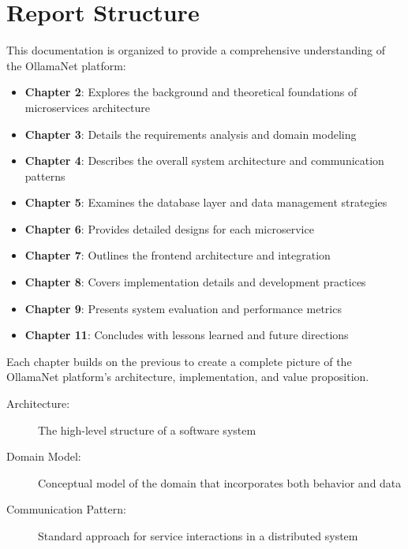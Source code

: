 \section{Report Structure}

This documentation is organized to provide a comprehensive understanding of the OllamaNet platform:

\begin{itemize}
    \item \textbf{Chapter 2}: Explores the background and theoretical foundations of microservices architecture
    \item \textbf{Chapter 3}: Details the requirements analysis and domain modeling
    \item \textbf{Chapter 4}: Describes the overall system architecture and communication patterns
    \item \textbf{Chapter 5}: Examines the database layer and data management strategies
    \item \textbf{Chapter 6}: Provides detailed designs for each microservice
    \item \textbf{Chapter 7}: Outlines the frontend architecture and integration
    \item \textbf{Chapter 8}: Covers implementation details and development practices
    \item \textbf{Chapter 9}: Presents system evaluation and performance metrics
    \item \textbf{Chapter 11}: Concludes with lessons learned and future directions
\end{itemize}

Each chapter builds on the previous to create a complete picture of the OllamaNet platform's architecture, implementation, and value proposition.

\begin{terminology}
\begin{description}
    \item[Architecture:] The high-level structure of a software system
    \item[Domain Model:] Conceptual model of the domain that incorporates both behavior and data
    \item[Communication Pattern:] Standard approach for service interactions in a distributed system
\end{description}
\end{terminology}





